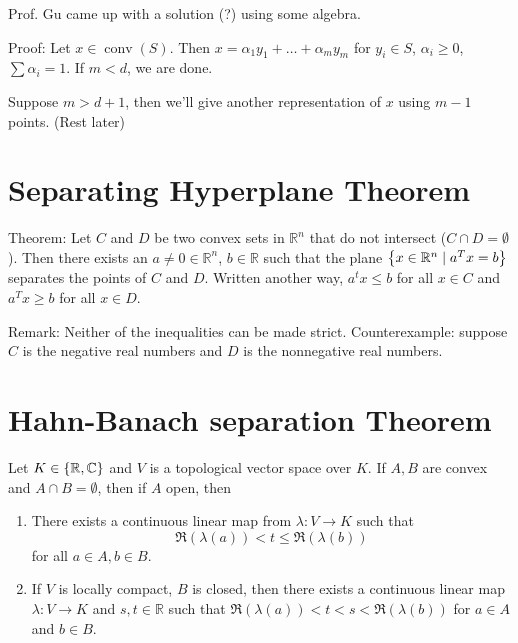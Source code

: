 \documentclass{article}
\newcommand{\RR}{\mathbb{R}}
\newcommand{\CC}{\mathbb{C}}
\begin{document}
Prof. Gu came up with a solution (?) using some algebra.


Proof: Let \(x \in \mathop{\mathrm{conv}}(S)\).
Then \(x = \alpha_1y_1 + \dots + \alpha_m y_m\) for \(y_i \in S\), \(\alpha_i \geq 0\), \(\sum \alpha_i = 1\).
If \(m < d\), we are done.

Suppose \(m > d+1\), then we'll give another representation of \(x\) using \(m - 1\) points. (Rest later)

\section{Separating Hyperplane Theorem}
Theorem: Let \(C\) and \(D\) be two convex sets in \(\RR^n\) that do not intersect (\(C \cap D = \emptyset\)).
Then there exists an \(a \neq 0\in \RR^n\), \(b \in \RR\) such that the plane \(\set{x \in \RR^n \mid a^Tx = b}\) separates the points of \(C\) and \(D\).
Written another way, \(a^tx \leq b\) for all \(x \in C\) and \(a^Tx \geq b\) for all \(x \in D\).

Remark: Neither of the inequalities can be made strict.
Counterexample: suppose \(C\) is the negative real numbers and \(D\) is the nonnegative real numbers.

\section{Hahn-Banach separation Theorem}
Let \(K \in \set{\RR, \CC}\) and \(V\) is a topological vector space over \(K\).
If \(A, B\) are convex and \(A \cap B = \emptyset\), then if \(A\) open, then
\begin{enumerate}
\item There exists a continuous linear map from \(\lambda : V \to K\) such that
  \[\Re(\lambda(a)) < t \leq \Re(\lambda(b))\]
  for all \(a \in A, b \in B\).

\item If \(V\) is locally compact, \(B\) is closed, then there exists a continuous linear map \(\lambda : V \to K\) and \(s, t \in \RR\) such that \(\Re(\lambda(a)) < t < s < \Re(\lambda(b)) \)
  for \(a \in A\) and \(b \in B\).
\end{enumerate}
\end{document}
